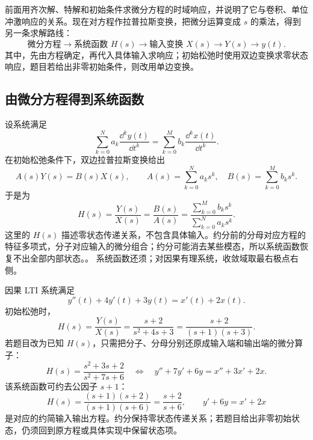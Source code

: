 前面用齐次解、特解和初始条件求微分方程的时域响应，并说明了它与卷积、单位冲激响应的关系。现在对方程作拉普拉斯变换，把微分运算变成 $s$ 的乘法，得到另一条求解路线：
\[
\text{微分方程}
\longrightarrow
\text{系统函数 }H(s)
\longrightarrow
\text{输入变换 }X(s)
\longrightarrow
Y(s)
\longrightarrow
y(t).
\]
其中，先由方程确定，再代入具体输入求响应；初始松弛时使用双边变换求零状态响应，题目若给出非零初始条件，则改用单边变换。

\subsection{由微分方程得到系统函数}
\label{subsec:laplace-system-function}

设系统满足
\begin{equation}
  \sum_{k=0}^{N}a_k\frac{\dd^k y(t)}{\dd t^k}
  =
  \sum_{k=0}^{M}b_k\frac{\dd^k x(t)}{\dd t^k}.
  \label{eq:laplace-system-function-ode}
\end{equation}
在初始松弛条件下，双边拉普拉斯变换给出
\[
  A(s)Y(s)=B(s)X(s),
  \qquad
  A(s)=\sum_{k=0}^{N}a_ks^k,\quad
  B(s)=\sum_{k=0}^{M}b_ks^k.
\]
于是为
\begin{equation}
  H(s)=\frac{Y(s)}{X(s)}
  =\frac{B(s)}{A(s)}
  =\frac{\displaystyle\sum_{k=0}^{M}b_ks^k}
  {\displaystyle\sum_{k=0}^{N}a_ks^k}.
  \label{eq:laplace-system-function-ratio}
\end{equation}
这里的 $H(s)$ 描述零状态传递关系，不包含具体输入。约分前的分母对应方程的特征多项式，分子对应输入的微分组合；约分可能消去某些模态，所以系统函数恢复不出全部内部状态。。
系统函数还须；对因果有理系统，收敛域取最右极点右侧。

\begin{example}[由微分方程求系统函数]
\label{eg:laplace-ode-to-system-function}
  因果 LTI 系统满足
  \[
    y''(t)+4y'(t)+3y(t)=x'(t)+2x(t).
  \]
  初始松弛时，
  \[
    H(s)=\frac{Y(s)}{X(s)}
    =\frac{s+2}{s^2+4s+3}
    =\frac{s+2}{(s+1)(s+3)}.
  \]
  若题目改为已知 $H(s)$，只需把分子、分母分别还原成输入端和输出端的微分算子：
  \[
    H(s)=\frac{s^2+3s+2}{s^2+7s+6}
    \quad\Longleftrightarrow\quad
    y''+7y'+6y=x''+3x'+2x.
  \]
  该系统函数可约去公因子 $s+1$：
  \[
    H(s)=\frac{(s+1)(s+2)}{(s+1)(s+6)}
    =\frac{s+2}{s+6},
    \qquad
    y'+6y=x'+2x
  \]
  是对应的约简输入输出方程。约分保持零状态传递关系；若题目给出非零初始状态，仍须回到原方程或具体实现中保留状态项。
\end{example}

